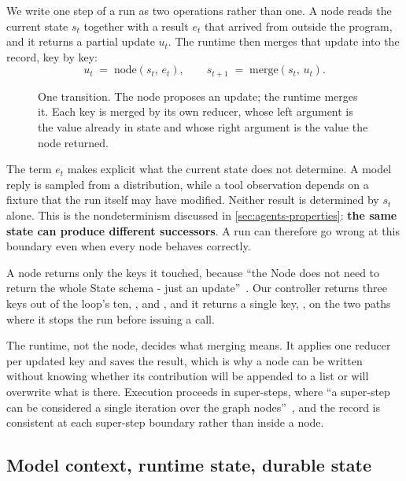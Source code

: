 We write one step of a run as two operations rather than one. A node reads the current state
$s_t$ together with a result $e_t$ that arrived from outside the program, and it returns a partial
update $u_t$. The runtime then merges that update into the record, key by key:
\[
  u_t \;=\; \mathrm{node}(s_t,\, e_t), \qquad
  s_{t+1} \;=\; \mathrm{merge}(s_t,\, u_t).
\]

\begin{figure}[htbp]
  \centering
  
  \caption{One transition. The node proposes an update; the runtime merges it. Each key is merged
  by its own reducer, whose left argument is the value already in state and whose right argument is
  the value the node returned.}
  \label{fig:state-transition}
\end{figure}

The term $e_t$ makes explicit what the current state does not determine. A model reply is sampled
from a distribution, while a tool observation depends on a fixture that the run itself may have
modified. Neither result is determined by $s_t$ alone. This is the nondeterminism discussed in
\cref{sec:agents-properties}: \textbf{the same state can produce different successors}. A run can
therefore go wrong at this boundary even when every node behaves correctly.

A node returns only the keys it touched, because ``the Node does not need to return the whole State
schema - just an update''~\citep{langgraph-graph-api}. Our controller returns three keys out of the
loop's ten, ,  and , and it returns a
single key, , on the two paths where it stops the run before issuing a call.

The runtime, not the node, decides what merging means. It applies one reducer per updated key and
saves the result, which is why a node can be written without knowing whether its contribution will
be appended to a list or will overwrite what is there. Execution proceeds in super-steps, where ``a
super-step can be considered a single iteration over the graph nodes''~\citep{langgraph-graph-api},
and the record is consistent at each super-step boundary rather than inside a node.

\subsection{Model context, runtime state, durable state}
\label{sec:state-three}


